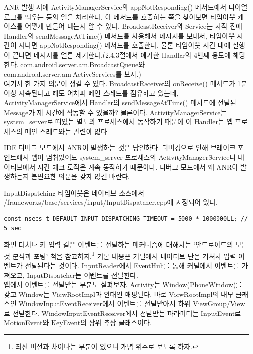 ANR 발생 시에 ActivityManagerService의 appNotResponding() 메서드에서 다이얼로그를 띄우는 등의 일을 처리한다. 이 메서드를 호출하는 쪽을 찾아보면 타임아웃 케이스를 어떻게 만들어 내는지 알 수 있다.
BroadcastReceiver와 Service는 시작 전에 Handler의 sendMessageAtTime() 메서드를 사용해서 메시지를 보내서, 타임아웃 시간이 지나면 appNotResponding() 메서드를 호출한다. 물론 타임아웃 시간 내에 실행이 끝나면 메시지를 얼른 제거한다.(2.4.3절에서 얘기한 Handler의 4번째 용도에 해당한다. com.android.server.am.BroadcastQueue와 com.android.server.am.ActiveServices를 보자.)\\

여기서 한 가지 의문이 생길 수 있다. BroadcastReceiver의 onReceive() 메서드가 1분 이상 지속된다고 해도 어차피 메인 스레드를 점유하고 있는데, ActivityManagerService에서 Handler의 sendMessageAtTime() 메서드에 전달된 Message가 제 시간에 작동할 수 있을까? 
물론이다. ActivityManagerService는 system\_server로 떠있는 별도의 프로세스에서 동작하기 때문에 이 Handler는 앱 프로세스의 메인 스레드와는 관련이 없다.\\

\colorbox{tearose}{\parbox[t]{15cm}{
IDE 디버그 모드에서 ANR이 발생하는 것은 당연하다. 디버깅으로 인해 브레이크 포인트에서 앱이 멈춰있어도 system\_server 프로세스의 ActivityManagerService나 네이티브에서 시간 체크 로직은 계속 동작하기 때문이다. 디버그 모드에서 왜 ANR이 발생하는지 불필요한 의문을 갖지 않길 바란다.
}}\newline\newline

InputDispatching 타임아웃은 네이티브 소스에서 /frameworks/base/services/input/InputDispatcher.cpp에 지정되어 있다.
\begin{lstlisting}[frame=single] 
	const nsecs_t DEFAULT_INPUT_DISPATCHING_TIMEOUT = 5000 * 1000000LL; // 5 sec
\end{lstlisting}
화면 터치나 키 입력 같은 이벤트를 전달하는 메커니즘에 대해서는 `안드로이드의 모든 것 분석과 포팅' 책을 참고하자.\footnote{최신 버전과 차이나는 부분이 있으니 개념 위주로 보도록 하자.} 기본 내용은 커널에서 네이티브 단을 거쳐서 입력 이벤트가 전달된다는 것이다. InputReader에서 EventHub를 통해 커널에서 이벤트를 가져오고, InputDispatcher는 이벤트를 전달한다.\\

앱에서 이벤트를 전달받는 부분도 살펴보자. Activity는 Window(PhoneWindow)를 갖고 Window는 ViewRootImpl과 일대일 매핑된다. 바로 ViewRootImpl의 내부 클래스인 WindowInputEventReceiver에서 이벤트를 전달받아서 하위 ViewGroup/View로 전달한다. WindowInputEventReceiver에서 전달받는 파라미터는 InputEvent로 MotionEvent와 KeyEvent의 상위 추상 클래스이다.\\

